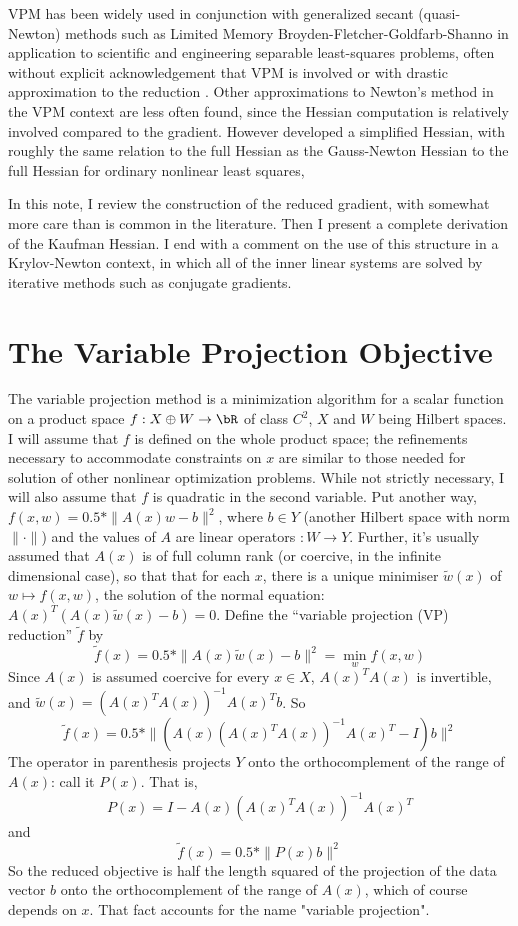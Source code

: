 VPM has been widely used in conjunction with generalized secant (quasi-Newton) methods such as Limited Memory Broyden-Fletcher-Goldfarb-Shanno \cite[]{NocedalWright} in application to scientific and engineering separable least-squares problems, often without explicit acknowledgement that VPM is involved or with drastic approximation to the reduction \cite[]{Ghattas:IP25,LeeuwenHerrmann:16,vanLeeuwenMulder:09,Warner:16}. Other approximations to Newton's method in the VPM context are less often found, since the Hessian computation is relatively involved compared to the gradient. However \cite{Kaufman:75} developed a simplified Hessian, with roughly the same relation to the full Hessian as the Gauss-Newton Hessian to the full Hessian for ordinary nonlinear least squares, 

In this note, I review the construction of the reduced gradient, with somewhat more care than is common in the literature. Then I present a complete derivation of the Kaufman Hessian. I end with a comment on the use of this structure in a Krylov-Newton context, in which all of the inner linear systems are solved by iterative methods such as conjugate gradients. 

\section{The Variable Projection Objective}
The variable projection method is a minimization algorithm for a scalar function on a product space $f:X \oplus W \rightarrow \bR$ of class $C^2$, $X$ and $W$ being Hilbert spaces. I will assume that $f$ is defined on the whole product space; the refinements necessary to accommodate constraints on $x$ are similar to those needed for solution of other nonlinear optimization problems. While not strictly necessary, I will also assume that $f$ is quadratic in the second variable. Put another way, $f(x,w) = 0.5*\|A(x)w-b\|^2$, where $b \in Y$ (another Hilbert space with norm $\|\cdot\|$) and the values of $A$ are linear operators $: W \rightarrow Y$. Further, it's usually assumed that $A(x)$ is of full column rank (or coercive, in the infinite dimensional case), so that that for each $x$, there is a unique minimiser $\tilde{w}(x)$ of $w \mapsto f(x,w)$, the solution of the normal equation: $A(x)^T(A(x)\tilde{w}(x) - b)=0$. Define the ``variable projection (VP) reduction'' $\tilde{f}$ by 
$$
\tilde{f}(x) = 0.5*\|A(x)\tilde{w}(x)-b\|^2= \min_w f(x,w)
$$
Since $A(x)$ is assumed coercive for every $x \in X$, $A(x)^TA(x)$ is invertible, and $\tilde{w}(x) = (A(x)^TA(x))^{-1}A(x)^Tb$. So
$$ 
\tilde{f}(x) = 0.5*\|(A(x)(A(x)^TA(x))^{-1}A(x)^T - I)b\|^2
$$
The operator in parenthesis projects $Y$ onto the orthocomplement of the range of $A(x)$: call it $P(x)$. That is,
\begin{equation}
  \label{eqn:proj}
P(x) = I-A(x)(A(x)^TA(x))^{-1}A(x)^T
\end{equation}
and
$$
\tilde{f}(x) = 0.5*\|P(x)b\|^2
$$
So the reduced objective is half the length squared of the projection of the data vector $b$ onto the orthocomplement of the range of $A(x)$, which of course depends on $x$. That fact accounts for the name "variable projection".

